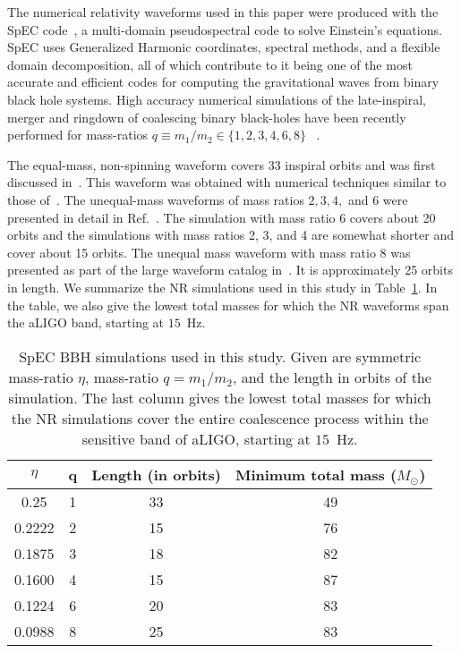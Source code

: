
The numerical relativity waveforms used in this paper were produced
with the SpEC code~\cite{spec}, a multi-domain pseudospectral code to solve
Einstein's equations. SpEC uses Generalized Harmonic coordinates,
spectral methods, and a flexible domain decomposition, all of which
contribute to it being one of the most accurate and efficient codes
for computing the gravitational waves from binary black hole
systems. High accuracy numerical simulations of the late-inspiral,
merger and ringdown  of coalescing binary black-holes have been
recently performed for mass-ratios $q\equiv m_1/m_2\in\{1,2,3,4,6,8\}$
~\cite{Buchman:2012dw,Scheel:2008rj,NRPNComparisonBoyleetal,Mroue:2012kv}.

The equal-mass,
non-spinning waveform covers 33 inspiral orbits and was first discussed
in~\cite{MacDonald:2012mp,Mroue:2012kv}. 
This waveform was obtained with numerical techniques similar to those 
of~\cite{Buchman:2012dw}. The unequal-mass waveforms of mass ratios 
$2, 3, 4,$ and $6$ were presented in detail in Ref.~\cite{Buchman:2012dw}.
The simulation with mass ratio $6$ covers about 20 orbits and the
simulations with mass ratios 2, 3, and 4 are somewhat shorter and
cover about 15 orbits. The unequal mass waveform with mass ratio 8 was
presented as part of the large waveform catalog
in~\cite{Mroue:2013xna,Mroue:2012kv}. It is approximately 25 orbits in
length. 
We summarize the NR simulations used in this study in 
Table~\ref{table:etalist4}. In the table, we also give the  
lowest total masses for which the NR waveforms span the aLIGO 
band, starting at $15$~Hz.

\begin{table}
\begin{tabular}{| c | c | c | c |}
\hline
$\hspace{10pt}\eta\hspace{10pt}$ & \hspace{15pt} q\hspace{15pt} & Length (in orbits) & Minimum total mass ($M_\odot$)\\ \hline
0.25 & 1 & 33 & 49 \\
0.2222 & 2 & 15 & 76 \\
0.1875 & 3 & 18 & 82 \\
0.1600 & 4 & 15 & 87 \\
0.1224 & 6 & 20 & 83 \\
0.0988 & 8 & 25 & 83 \\
\hline
\end{tabular}
\caption{SpEC BBH simulations used in this study.  Given are symmetric mass-ratio $\eta$, mass-ratio $q=m_1/m_2$, and the length in orbits of the simulation. 
The last column gives the lowest total masses for which the NR simulations 
cover the entire coalescence process within the sensitive band of aLIGO,
starting at $15$~Hz.}
\label{table:etalist4}
\end{table}
